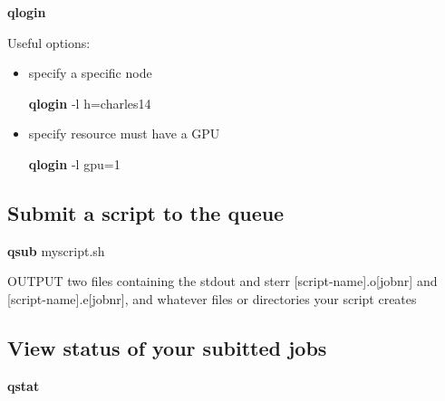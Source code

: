\documentclass[]{article}
\newenvironment{Shaded}{\begin{snugshade}}{\end{snugshade}}
\newcommand{\KeywordTok}[1]{\textcolor[rgb]{0.13,0.29,0.53}{\textbf{{#1}}}}
\newcommand{\NormalTok}[1]{{#1}}
\begin{document}
\begin{Shaded}
\begin{Highlighting}[]
\KeywordTok{qlogin}
\end{Highlighting}
\end{Shaded}

Useful options:

\begin{itemize}
\item
  specify a specific node

\begin{Shaded}
\begin{Highlighting}[]
\KeywordTok{qlogin} \NormalTok{-l h=charles14}
\end{Highlighting}
\end{Shaded}
\item
  specify resource must have a GPU

\begin{Shaded}
\begin{Highlighting}[]
\KeywordTok{qlogin} \NormalTok{-l gpu=1}
\end{Highlighting}
\end{Shaded}
\end{itemize}

\subsection{Submit a script to the
queue}\label{submit-a-script-to-the-queue}

\begin{Shaded}
\begin{Highlighting}[]
\KeywordTok{qsub} \NormalTok{myscript.sh}
\end{Highlighting}
\end{Shaded}

OUTPUT two files containing the stdout and sterr
{[}script-name{]}.o{[}jobnr{]} and {[}script-name{]}.e{[}jobnr{]}, and
whatever files or directories your script creates

\subsection{View status of your subitted
jobs}\label{view-status-of-your-subitted-jobs}

\begin{Shaded}
\begin{Highlighting}[]
\KeywordTok{qstat}
\end{Highlighting}
\end{Shaded}
\end{document}
